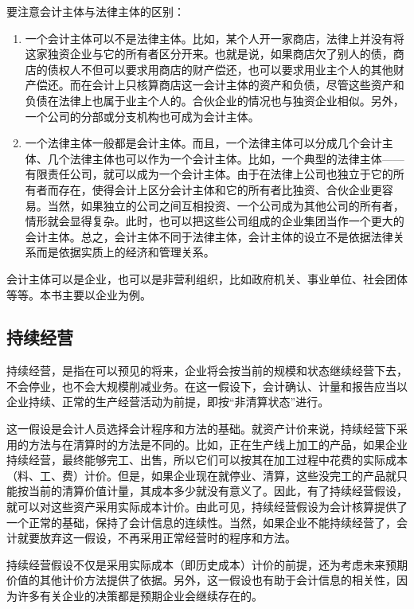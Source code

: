 		要注意会计主体与法律主体的区别：
		\begin{enumerate}
			\item 一个会计主体可以不是法律主体。比如，某个人开一家商店，法律上并没有将这家独资企业与它的所有者区分开来。也就是说，如果商店欠了别人的债，商店的债权人不但可以要求用商店的财产偿还，也可以要求用业主个人的其他财产偿还。而在会计上只核算商店这一会计主体的资产和负债，尽管这些资产和负债在法律上也属于业主个人的。合伙企业的情况也与独资企业相似。另外，一个公司的分部或分支机构也可成为会计主体。

			\item 一个法律主体一般都是会计主体。而且，一个法律主体可以分成几个会计主体、几个法律主体也可以作为一个会计主体。比如，一个典型的法律主体——有限责任公司，就可以成为一个会计主体。由于在法律上公司也独立于它的所有者而存在，使得会计上区分会计主体和它的所有者比独资、合伙企业更容易。当然，如果独立的公司之间互相投资、一个公司成为其他公司的所有者，情形就会显得复杂。此时，也可以把这些公司组成的企业集团当作一个更大的会计主体。总之，会计主体不同于法律主体，会计主体的设立不是依据法律关系而是依据实质上的经济和管理关系。
		\end{enumerate}
		
		会计主体可以是企业，也可以是非营利组织，比如政府机关、事业单位、社会团体等等。本书主要以企业为例。
		
		\subsection{持续经营}

		持续经营，是指在可以预见的将来，企业将会按当前的规模和状态继续经营下去，不会停业，也不会大规模削减业务。在这一假设下，会计确认、计量和报告应当以企业持续、正常的生产经营活动为前提，即按“非清算状态”进行。
		
		这一假设是会计人员选择会计程序和方法的基础。就资产计价来说，持续经营下采用的方法与在清算时的方法是不同的。比如，正在生产线上加工的产品，如果企业持续经营，最终能够完工、出售，所以它们可以按其在加工过程中花费的实际成本（料、工、费）计价。但是，如果企业现在就停业、清算，这些没完工的产品就只能按当前的清算价值计量，其成本多少就没有意义了。因此，有了持续经营假设，就可以对这些资产采用实际成本计价。由此可见，持续经营假设为会计核算提供了一个正常的基础，保持了会计信息的连续性。当然，如果企业不能持续经营了，会计就要放弃这一假设，不再采用正常经营时的程序和方法。
		
		持续经营假设不仅是采用实际成本（即历史成本）计价的前提，还为考虑未来预期价值的其他计价方法提供了依据。另外，这一假设也有助于会计信息的相关性，因为许多有关企业的决策都是预期企业会继续存在的。
		
